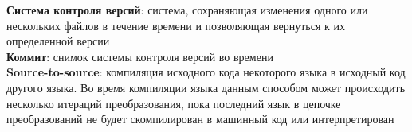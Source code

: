 \textbf{Система контроля версий}: система, сохраняющая изменения одного или нескольких файлов в течение времени и позволяющая вернуться к их определенной версии \\
\textbf{Коммит}: снимок системы контроля версий во времени \\
\textbf{Source-to-source}: компиляция исходного кода некоторого языка в исходный код другого языка. Во время компиляции языка данным способом
 может происходить несколько итераций преобразования,
 пока последний язык в цепочке преобразований не будет скомпилирован в машинный код или интерпретирован \\
